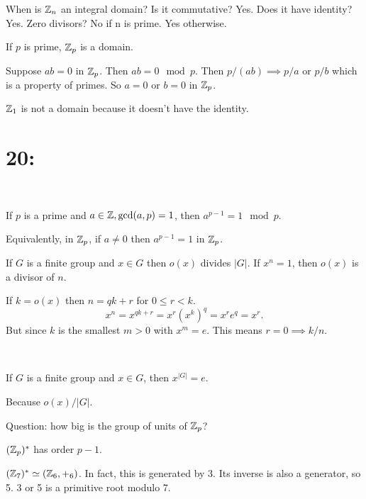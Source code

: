 \documentclass[class=article,crop=false]{standalone}
\begin{document}
When is $ \mathbb{Z}_n$ an integral domain?
Is it commutative? Yes. Does it have identity? Yes. Zero divisors? No if n is prime. Yes otherwise.

\begin{prop}[]
If $ p$ is prime,  $ \mathbb{Z}_p$ is a domain.
\end{prop}
\begin{prf}
	Suppose $ ab=0$ in  $ \mathbb{Z}_p$. Then $ ab=0 \mod p$. Then $ p / (ab) \implies p/ a \text{ or } p / b $ which is a property of primes. So $ a=0$ or  $ b=0$ in  $ \mathbb{Z}_p$.
\end{prf}

\begin{note}[]
$ \mathbb{Z}_1$ is not a domain because it doesn't have the identity.
\end{note}

\section*{20:}

~\begin{thm}
If $ p$ is a prime and  $a \in \mathbb{Z}, \gcd ( a,p)=1 $, then $ a^{p-1}= 1 \mod p$. 

Equivalently, in $ \mathbb{Z}_p$, if $ a\neq 0$ then  $ a^{p-1}=1$ in $ \mathbb{Z}_p$.
\end{thm}
\begin{lem}[1]
	If $ G$ is a finite group and  $ x \in G$ then $ o(x)$ divides  $ |G|$. If  $ x^{n}=1$, then $ o(x)$ is a divisor of  $ n$.
\end{lem}
\begin{prf}
	If $ k=o(x)$ then  $ n=qk+r$ for  $ 0\leq r<k$. 
	 \[
		 x^{n}=x^{qk+r}=x^{r}(x^{k})^{q} = x^{r} e^{q}=x^{r}
	.\] 
	But since $ k$ is the smallest  $ m>0$ with  $ x^{m}=e$. This means $ r=0 \implies k /n$.
\end{prf}
~\begin{lem}[2]
	If $ G$ is a finite group and  $ x \in G$, then $ x^{|G|}=e$.
\end{lem}
Because $ o(x) / |G|$.

Question: how big is the group of units of $ \mathbb{Z}_p$?

$ (\mathbb{Z}_p)^* $ has order $ p-1$. 

\begin{eg}[]
	$ (\mathbb{Z}_7)^* \simeq (\mathbb{Z}_6, +_{ 6} )$. In fact, this is generated by 3. Its inverse is also a generator, so 5. 3 or 5 is a primitive root modulo 7.
\end{eg}
\end{document}
